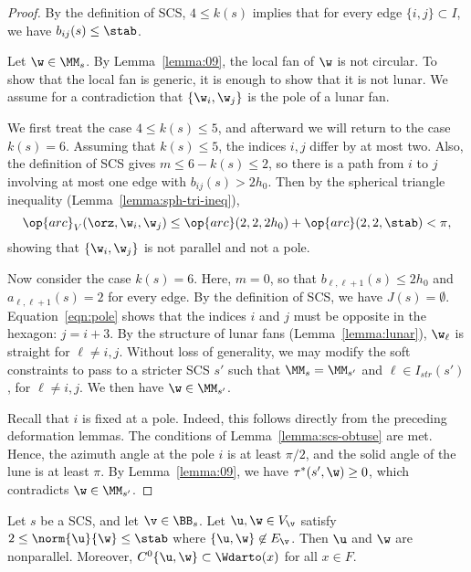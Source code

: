 \begin{proof}
By the definition of SCS, $4\le k(s)$ implies
that  for every edge $\{i,j\}\subset I$, we have
$b_{i j}(s) \le\stab$.

Let $\w\in \MM_s$.  By Lemma~\ref{lemma:09}, the local fan of $\w$  is not circular.
To show that the local fan is generic, it is enough to show that it is not lunar.
We assume for a contradiction that $\{\w_i,\w_j\}$ is the pole of a lunar fan.

We first treat the case  $4\le k(s)\le 5$,
and afterward we will return to the case $k(s)=6$. 
Assuming that  $k(s)\le 5$, the indices $i,j$ differ by at most two.
Also, the definition of SCS gives $m\le 6-k(s)\le 2$, so there is a path from
$i$ to $j$ involving at most one edge with $b_{i j}(s)>2h_0$.
Then by the spherical triangle inequality (Lemma~\ref{lemma:sph-tri-ineq}),
\begin{equation}\label{eqn:pole}
\op{arc}_V(\orz,\w_i,\w_j) \le \op{arc}(2,2,2h_0) + \op{arc}(2,2,\stab) < \pi,
\end{equation}
showing that $\{\w_i,\w_j\}$ is not parallel and not a pole.

Now consider the case $k(s)=6$.  Here, $m=0$, so that $b_{\ell,\ell+1}(s)\le 2h_0$
and $a_{\ell,\ell+1}(s)=2$
for every edge. By the definition of SCS, we have $J(s)=\emptyset$.
Equation~\ref{eqn:pole} shows that the indices $i$ and $j$
must be opposite in the hexagon: $j = i+3$.  By the structure of lunar fans
(Lemma~\ref{lemma:lunar}), $\w_\ell$ is straight for $\ell\ne i,j$.  Without
loss of generality, we may
modify the soft constraints to pass to a stricter SCS $s'$ such that
$\MM_s = \MM_{s'}$ and
$\ell\in I_{str}(s')$, for $\ell\ne i,j$.  We then have $\w\in \MM_{s'}$.

Recall that $i$ is fixed at a pole. 
  Indeed, this follows directly from the preceding deformation
lemmas.  The conditions of Lemma~\ref{lemma:scs-obtuse} are met.
Hence, the azimuth angle at the pole $i$ is at least $\pi/2$, and
 the solid angle of the lune is at least $\pi$.  By Lemma~\ref{lemma:09},
we have $\tau^*(s',\w)\ge0$, which contradicts $\w\in \MM_{s'}$.
\end{proof}

\begin{lemma}[]\label{lemma:2hm-slice1}
Let $s$ be a SCS, and let $\v\in \BB_s$.
Let $\u,\w\in V_\v$ satisfy $2\le\norm{\u}{\w}\le \stab$ where
$\{\u,\w\}\not\in E_\v$.  Then $\u$ and $\w$ are nonparallel.
Moreover,
$C^0\{\u,\w\}\subset \Wdarto(x)$ for all $x\in F$.
\end{lemma}


